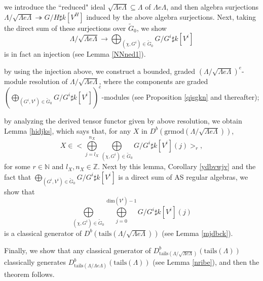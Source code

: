 \documentclass[11pt,reqno]{amsart}
\theoremstyle{definition}
\begin{document}
\vspace{2mm}

 we introduce the ``reduced" ideal $\sqrt{\Lambda e \Lambda} \subseteq \Lambda$ of $\Lambda e \Lambda$, 
 and then algebra surjections $\Lambda/ \sqrt{\Lambda e \Lambda} \twoheadrightarrow G/H \sharp k[V^{H}]$ 
induced by the above algebra surjections. 
Next, taking the direct sum of these
surjections 
over $\tilde G_0$, we show 
$$
\Lambda/\sqrt{\Lambda e \Lambda} \rightarrow 
\bigoplus_{(\chi, G^i) \in \tilde{G}_0}  G/G^i \sharp k[V^i]
$$
is in fact an injection (see Lemma \ref{NNned1}). 

\vspace{2mm}

 by using the injection above, 
we construct a bounded, graded $(\Lambda/ \sqrt{\Lambda e \Lambda})^e$-module 
resolution of $\Lambda/ \sqrt{\Lambda e \Lambda}$, where the components are
graded $( \bigoplus\limits_{(G^i, V^i) \in \tilde{G}_0} G/G^i \sharp k[V^i] )^{e}$-modules 
(see Proposition \ref{qjsgkn} and thereafter); 

\vspace{2mm}

by analyzing the derived tensor functor given by above resolution,  
we obtain Lemma \ref{hidjks}, which says
that,
for
any $X$ in $D^{b}(\mathrm{grmod}(\Lambda / \sqrt{\Lambda e \Lambda}) )$,
$$
X \in \Big< \bigoplus\limits_{j= l_X}^{n_X} \bigoplus\limits_{(\chi, G^i) \in \tilde{G}_0}  
G / G^i \sharp k[V^i](j) \Big>_{r},
$$
for some $r \in \mathbb{N}$ and $l_X, n_X \in \mathbb{Z}$.
Next by this lemma, Corollary \ref{ydbvwjv}
and the fact that 
$\bigoplus\limits_{(G^i, V^i) \in \tilde{G}_0} G/G^i \sharp k[V^i]$ is a direct sum of 
AS regular algebras, 
we show that $$\bigoplus\limits_{(\chi, G^i) \in \tilde{G}_0} 
\bigoplus\limits_{j = 0}^{\mathrm{dim}(V^i) -1} G / G^i \sharp k[V^i](j)$$ is a
classical generator of $D^{b}(\mathrm{tails}
(\Lambda / \sqrt{\Lambda e \Lambda}))$ (see Lemma \ref{mjdbck}). 

\vspace{2mm}

 Finally, 
we show that
any classical generator of
$D^{b}_{\mathrm{tails}(\Lambda/ \sqrt{\Lambda e \Lambda})}(\mathrm{tails}(\Lambda))$ classically generates
$D^{b}_{\mathrm{tails}(\Lambda/\Lambda e \Lambda)}(\mathrm{tails}(\Lambda))
$ (see Lemma \ref{nribe}),
and then the theorem follows. 
\end{document}
